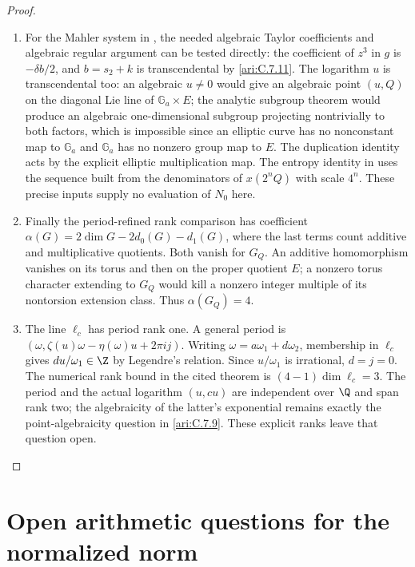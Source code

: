 \begin{proof}
\begin{enumerate}[label=\arabic*.,leftmargin=0pt,labelsep=.5em]
\begin{enumerate}[label={$\langle2\rangle$\arabic*.},leftmargin=1.3em,labelsep=.5em]
\item  For the Mahler system in
\citep[Theorem1.1 and system(1.2)]{adamczewski2017mahler},
the needed algebraic Taylor coefficients and algebraic regular
argument can be tested directly: the coefficient of $z^3$ in
$g$ is $-\delta b/2$, and $b=s_2+k$ is transcendental by
\ref{ari:C.7.11}. The logarithm $u$ is transcendental too:
an algebraic $u\ne0$ would give an algebraic point $(u,Q)$
on the diagonal Lie line of $\mathbb G_a\times E$; the analytic
subgroup theorem would produce an algebraic one-dimensional
subgroup projecting nontrivially to both factors, which is
impossible since an elliptic curve has no nonconstant map to
$\mathbb G_a$ and $\mathbb G_a$ has no nonzero group map to $E$.
The duplication identity acts by the explicit elliptic
multiplication map. The entropy identity in
\citep[Theorem5.1]{einsiedler2001entropy} uses the sequence
built from the denominators of $x(2^nQ)$ with scale $4^n$.
These precise inputs supply no evaluation of $N_0$ here.


\item  Finally the period-refined rank comparison
\citep[Theorem4.1 and Corollary4.3]{waldschmidt1988periodrank}
\citep[main theorem,p.363]{roy1993periodrank}
has coefficient $\alpha(G)=2\dim G-2d_0(G)-d_1(G)$,
where the last terms count additive and multiplicative
quotients. Both vanish for $G_Q$. An additive homomorphism
vanishes on its torus and then on the proper quotient $E$;
a nonzero torus character extending to $G_Q$ would kill a
nonzero integer multiple of its nontorsion extension class.
Thus $\alpha(G_Q)=4$.


\item  The line $\ell_c$ has period rank one. A general period is
$(\omega,\zeta(u)\omega-\eta(\omega)u+2\pi i j)$.
Writing $\omega=a\omega_1+d\omega_2$, membership in
$\ell_c$ gives $du/\omega_1\in\Z$ by Legendre's relation.
Since $u/\omega_1$ is irrational, $d=j=0$. The numerical
rank bound in the cited theorem is
$(4-1)\dim\ell_c=3$. The period and the actual logarithm
$(u,cu)$ are independent over $\Q$ and span rank two;
the algebraicity of the latter's exponential remains exactly
the point-algebraicity question in \ref{ari:C.7.9}. These
explicit ranks leave that question open.


\end{enumerate}

\end{enumerate}
\end{proof}


\section{Open arithmetic questions for the normalized norm}\hypertarget{tag-003T}{}\label{ari:open:norm}



